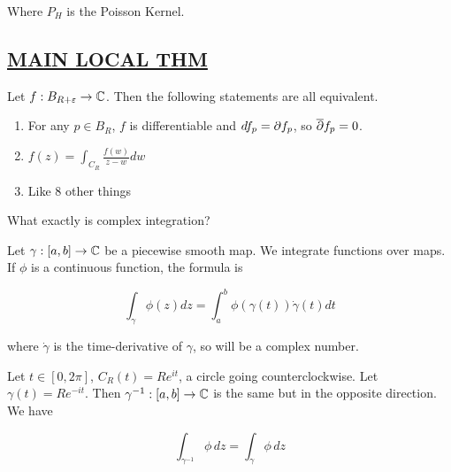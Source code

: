 \documentclass[x11names,reqno,14pt]{extarticle}
\begin{document}
Where $P_H$ is the Poisson Kernel. 

\subsection*{\underline{MAIN LOCAL THM}}
Let $f:B_{R + \varepsilon}\to \mathbb{C}$. Then the following statements are all equivalent. 
\begin{enumerate}
\item For any $p \in B_R$, $f$ is differentiable and $df_p = \partial f_p$, so $\overline{\partial}f_p = 0$.
\item $f(z) = \int_{C_R}\frac{f(w)}{z - w}dw$
\item Like 8 other things
\end{enumerate}

What exactly is complex integration? 

Let $\gamma:[a, b]\to\mathbb{C}$ be a piecewise smooth map. We integrate functions over maps. If $\phi$ is a continuous function, the formula is 

\[
\int_\gamma\phi(z)dz = \int_a^b\phi(\gamma(t))\dot{\gamma}(t)dt
\]

where $\dot{\gamma}$ is the time-derivative of $\gamma$, so will be a complex number. 

Let $t \in [0, 2\pi]$, $C_R(t) = Re^{it}$, a circle going counterclockwise. Let $\gamma(t) = Re^{-it}$. Then $\gamma^{-1}:[a, b]\to\mathbb{C}$ is the same but in the opposite direction. We have

\[
\int_{\gamma^{-1}}\phi\,dz = \int_{\gamma}\phi\,dz
\]
\end{document}
